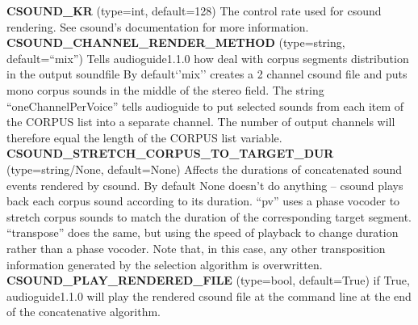 \documentclass{article}
\newcommand{\optEntry}[4]{\textbf{#1} (type=#2, default=#3) #4\hspace{0.5em}\\}
\newcommand{\ag}{audioguide1.1.0\xspace}
\begin{document}
\begin{spacing}{1.2}
\optEntry{CSOUND\_KR}{int}{128}{The control rate used for csound rendering.  See csound's documentation for more information.}

\optEntry{CSOUND\_CHANNEL\_RENDER\_METHOD}{string}{``mix''}{Tells \ag how deal with corpus segments distribution in the output soundfile  By default`'mix'' creates a 2 channel csound file and puts mono corpus sounds in the middle of the stereo field.  The string ``oneChannelPerVoice'' tells audioguide to put selected sounds from each item of the CORPUS list into a separate channel.  The number of output channels will therefore equal the length of the CORPUS list variable.}

\optEntry{CSOUND\_STRETCH\_CORPUS\_TO\_TARGET\_DUR}{string/None}{None}{Affects the durations of concatenated sound events rendered by csound.  By default None doesn't do anything -- csound plays back each corpus sound according to its duration.  ``pv'' uses a phase vocoder to stretch corpus sounds to match the duration of the corresponding target segment.  ``transpose'' does the same, but using the speed of playback to change duration rather than a phase vocoder.  Note that, in this case, any other transposition information generated by the selection algorithm is overwritten.}

\optEntry{CSOUND\_PLAY\_RENDERED\_FILE}{bool}{True}{if True, \ag will play the rendered csound file at the command line at the end of the concatenative algorithm.}



\end{spacing}
\end{document}
